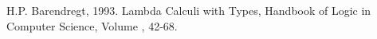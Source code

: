 \begin{thebibliography}{9}
H.P. Barendregt, 1993. Lambda Calculi with Types, Handbook of Logic in Computer Science, Volume , 42-68.
\end{thebibliography}